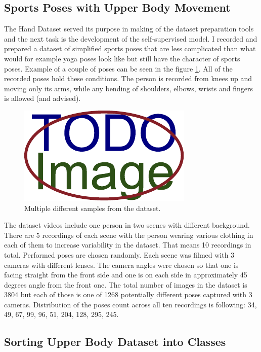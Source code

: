 \subsection{Sports Poses with Upper Body Movement}

The Hand Dataset served its purpose in making of the dataset preparation tools and the next task is the development of the self-supervised model. I recorded and prepared a dataset of simplified sports poses that are less complicated than what would for example yoga poses look like but still have the character of sports poses. Example of a couple of poses can be seen in the figure \ref{fig:dataset-upper-body-example}. All of the recorded poses hold these conditions. The person is recorded from knees up and moving only its arms, while any bending of shoulders, elbows, wrists and fingers is allowed (and advised).

\begin{figure}[ht]
    \centering
    \includegraphics{figures/placeholder.pdf}
    \caption{Multiple different samples from the dataset.}
    \label{fig:dataset-upper-body-example}
\end{figure}

The dataset videos include one person in two scenes with different background. There are 5 recordings of each scene with the person wearing various clothing in each of them to increase variability in the dataset. That means 10 recordings in total. Performed poses are chosen randomly. Each scene was filmed with 3 cameras with different lenses. The camera angles were chosen so that one is facing straight from the front side and one is on each side in approximately 45 degrees angle from the front one. The total number of images in the dataset is 3804 but each of those is one of 1268 potentially different poses captured with 3 cameras. Distribution of the poses count across all ten recordings is following: 34, 49, 67, 99, 96, 51, 204, 128, 295, 245.

\subsection{Sorting Upper Body Dataset into Classes}

